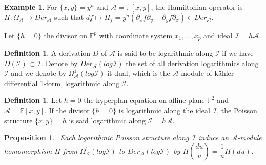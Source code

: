 \documentclass[a4paper, 12pt,oneside,reqno]{amsart}
\newtheorem{proposition}[theorem]{Proposition}
\theoremstyle{definition}
\newtheorem{definition}[theorem]{Definition}
\newtheorem{example}[theorem]{Example}
\begin{document}
\begin{example} For $\{x, y\} = y^n$ and $ \mathcal{A}= \mathbb{F}[x,y]$, the Hamiltonian operator is $H: \Omega _{\mathcal{A}} \longrightarrow Der _{\mathcal{A}}$ such that  $df\mapsto H_{f} = y^n (\partial_{x}f\partial_{y}  - \partial_{y}f \partial_{x})\in Der _{\mathcal{A}}$. 
\end{example}
Let  $\{h=0\}$ the divisor on $\mathbb{F}^{p}$ with coordinate system $x_{1},...,x_{p}$ and ideal $\mathcal{I} = h\mathcal{A}$.
 \begin{definition} \cite{DJ1}
A derivation $D$ of $\mathcal{A}$ is said to be  logarithmic along $\mathcal{I}$ if we have $D(\mathcal{I}) \subset \mathcal{I}$. Denote by $Der _{\mathcal{A}}(log \mathcal{I})$ the set of all  derivation logarithmics along $\mathcal{I}$ and  we denote by $\Omega^{1} _{\mathcal{A}}(log \mathcal{I})$ it dual, which is the  $\mathcal{A}$-module of  k\"{a}hler differential  1-form, logarithmic along $\mathcal{I}$.
\end{definition}

\begin{definition}
Let $h=0$ the hyperplan equation on affine plane $\mathbb{F}^{2}$ and $ \mathcal{A}= \mathbb{F}[x,y]$.
If the divisor $\{h=0\}$ is logarithmic along the ideal $\mathcal{I}$, the Poisson structure $\{x,y\} = h$ is said logarithmic along $\mathcal{I} =  h\mathcal{A}$.
\end{definition}

\begin{proposition} \cite{DJ1} $\label{P1}$
Each logarithmic Poisson structure along 
 $\mathcal{I}$ induce  an $\mathcal{A}$-module homomorphism $\tilde{H}$ from $\Omega ^{1}_{\mathcal{A}}(log \mathcal{I})$ to $Der _{\mathcal{A}}(log \mathcal{I})$ by $\tilde{H}(\dfrac{du}{u})=\dfrac{1}{u}H(du)$.
\end{proposition}
\end{document}
